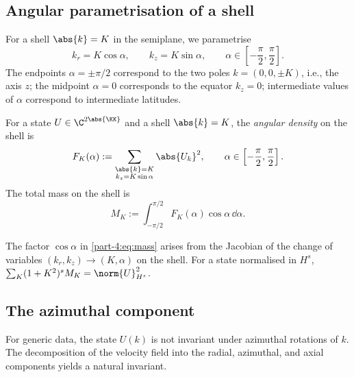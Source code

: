 \subsection{Angular parametrisation of a shell}
\label{part-4:ssec:shell-param}

For a shell $\abs{k}=K$ in the semiplane, we parametrise
\begin{equation}\label{part-4:eq:shell-param}
k_r = K\cos\alpha, \qquad k_z = K\sin\alpha, \qquad
\alpha\in\left[-\frac{\pi}{2}, \frac{\pi}{2}\right].
\end{equation}
The endpoints $\alpha = \pm\pi/2$ correspond to the two poles 
$k = (0,0,\pm K)$, i.e., the axis $z$; the midpoint $\alpha = 0$ 
corresponds to the equator $k_z = 0$; intermediate values of 
$\alpha$ correspond to intermediate latitudes.

\begin{definition}\label{part-4:def:angular-density}
For a state $U\in\C^{2\abs{\KK}}$ and a shell $\abs{k}=K$, the 
\emph{angular density} on the shell is
\begin{equation}\label{part-4:eq:angular-density}
F_K(\alpha) := \sum_{\substack{\abs{k}=K\\ k_z = K\sin\alpha}}
\abs{U_k}^2, \qquad \alpha\in\left[-\frac{\pi}{2}, \frac{\pi}{2}\right].
\end{equation}
The total mass on the shell is
\begin{equation}\label{part-4:eq:mass}
M_K := \int_{-\pi/2}^{\pi/2}F_K(\alpha)\cos\alpha\,\dd\alpha.
\end{equation}
\end{definition}

\begin{remark}[Normalisation]\label{part-4:rem:mass-norm}
The factor $\cos\alpha$ in \eqref{part-4:eq:mass} arises from the Jacobian 
of the change of variables $(k_r,k_z)\to(K,\alpha)$ on the shell. 
For a state normalised in $H^s$, $\sum_K(1+K^2)^s M_K = \norm{U}_{H^s}^2$.
\end{remark}

\subsection{The azimuthal component}
\label{part-4:ssec:azimuthal}

For generic data, the state $U(k)$ is not invariant under azimuthal 
rotations of $k$. The decomposition of the velocity field into the 
radial, azimuthal, and axial components yields a natural invariant.

